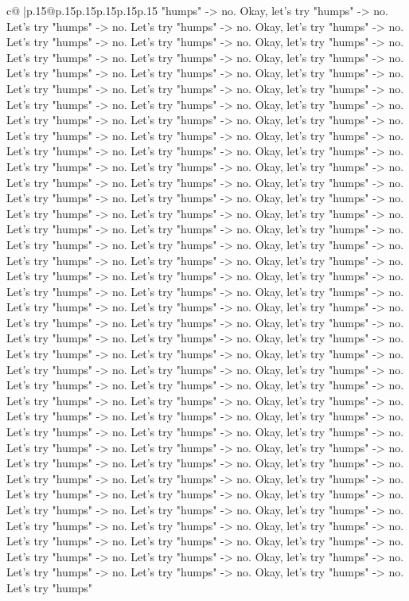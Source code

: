 \documentclass{article}
\begin{document}
{\begin{supertabular}{c@{$\;$}|p{.15\linewidth}@{}p{.15\linewidth}p{.15\linewidth}p{.15\linewidth}p{.15\linewidth}p{.15\linewidth}}
{{{"humps" {-}> no. Okay, let's try "humps" {-}> no. Let's try "humps" {-}> no. Let's try "humps" {-}> no. Okay, let's try "humps" {-}> no. Let's try "humps" {-}> no. Let's try "humps" {-}> no. Okay, let's try "humps" {-}> no. Let's try "humps" {-}> no. Let's try "humps" {-}> no. Okay, let's try "humps" {-}> no. Let's try "humps" {-}> no. Let's try "humps" {-}> no. Okay, let's try "humps" {-}> no. Let's try "humps" {-}> no. Let's try "humps" {-}> no. Okay, let's try "humps" {-}> no. Let's try "humps" {-}> no. Let's try "humps" {-}> no. Okay, let's try "humps" {-}> no. Let's try "humps" {-}> no. Let's try "humps" {-}> no. Okay, let's try "humps" {-}> no. Let's try "humps" {-}> no. Let's try "humps" {-}> no. Okay, let's try "humps" {-}> no. Let's try "humps" {-}> no. Let's try "humps" {-}> no. Okay, let's try "humps" {-}> no. Let's try "humps" {-}> no. Let's try "humps" {-}> no. Okay, let's try "humps" {-}> no. Let's try "humps" {-}> no. Let's try "humps" {-}> no. Okay, let's try "humps" {-}> no. Let's try "humps" {-}> no. Let's try "humps" {-}> no. Okay, let's try "humps" {-}> no. Let's try "humps" {-}> no. Let's try "humps" {-}> no. Okay, let's try "humps" {-}> no. Let's try "humps" {-}> no. Let's try "humps" {-}> no. Okay, let's try "humps" {-}> no. Let's try "humps" {-}> no. Let's try "humps" {-}> no. Okay, let's try "humps" {-}> no. Let's try "humps" {-}> no. Let's try "humps" {-}> no. Okay, let's try "humps" {-}> no. Let's try "humps" {-}> no. Let's try "humps" {-}> no. Okay, let's try "humps" {-}> no. Let's try "humps" {-}> no. Let's try "humps" {-}> no. Okay, let's try "humps" {-}> no. Let's try "humps" {-}> no. Let's try "humps" {-}> no. Okay, let's try "humps" {-}> no. Let's try "humps" {-}> no. Let's try "humps" {-}> no. Okay, let's try "humps" {-}> no. Let's try "humps" {-}> no. Let's try "humps" {-}> no. Okay, let's try "humps" {-}> no. Let's try "humps" {-}> no. Let's try "humps" {-}> no. Okay, let's try "humps" {-}> no. Let's try "humps" {-}> no. Let's try "humps" {-}> no. Okay, let's try "humps" {-}> no. Let's try "humps" {-}> no. Let's try "humps" {-}> no. Okay, let's try "humps" {-}> no. Let's try "humps" {-}> no. Let's try "humps" {-}> no. Okay, let's try "humps" {-}> no. Let's try "humps" {-}> no. Let's try "humps" {-}> no. Okay, let's try "humps" {-}> no. Let's try "humps" {-}> no. Let's try "humps" {-}> no. Okay, let's try "humps" {-}> no. Let's try "humps" {-}> no. Let's try "humps" {-}> no. Okay, let's try "humps" {-}> no. Let's try "humps" {-}> no. Let's try "humps" {-}> no. Okay, let's try "humps" {-}> no. Let's try "humps" {-}> no. Let's try "humps" {-}> no. Okay, let's try "humps" {-}> no. Let's try "humps" {-}> no. Let's try "humps" {-}> no. Okay, let's try "humps" {-}> no. Let's try "humps" {-}> no. Let's try "humps" {-}> no. Okay, let's try "humps" {-}> no. Let's try "humps" {-}> no. Let's try "humps" {-}> no. Okay, let's try "humps" {-}> no. Let's try "humps" {-}> no. Let's try "humps" {-}> no. Okay, let's try "humps" {-}> no. Let's try "humps" {-}> no. Let's try "humps" {-}> no. Okay, let's try "humps" {-}> no. Let's try "humps" {-}> no. Let's try "humps" {-}> no. Okay, let's try "humps" {-}> no. Let's try "humps" }}}
\end{supertabular}}
\end{document}
